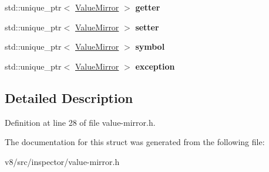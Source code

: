\begin{DoxyCompactItemize}
\item 
\mbox{\label{structv8__inspector_1_1PropertyMirror_a8b66857e0b8ba409d62c698948dd2ac8}} 
std\+::unique\+\_\+ptr$<$ \mbox{\hyperlink{classv8__inspector_1_1ValueMirror}{Value\+Mirror}} $>$ {\bfseries getter}
\item 
\mbox{\label{structv8__inspector_1_1PropertyMirror_aebe668fbb98aa981a2459b8ff858f742}} 
std\+::unique\+\_\+ptr$<$ \mbox{\hyperlink{classv8__inspector_1_1ValueMirror}{Value\+Mirror}} $>$ {\bfseries setter}
\item 
\mbox{\label{structv8__inspector_1_1PropertyMirror_a0c9869f80bca831f1d7231482e5a2cfe}} 
std\+::unique\+\_\+ptr$<$ \mbox{\hyperlink{classv8__inspector_1_1ValueMirror}{Value\+Mirror}} $>$ {\bfseries symbol}
\item 
\mbox{\label{structv8__inspector_1_1PropertyMirror_ac8a5d9d984e70780afaf27fa8b978a50}} 
std\+::unique\+\_\+ptr$<$ \mbox{\hyperlink{classv8__inspector_1_1ValueMirror}{Value\+Mirror}} $>$ {\bfseries exception}
\end{DoxyCompactItemize}


\subsection{Detailed Description}


Definition at line 28 of file value-\/mirror.\+h.



The documentation for this struct was generated from the following file\+:\begin{DoxyCompactItemize}
\item 
v8/src/inspector/value-\/mirror.\+h\end{DoxyCompactItemize}
